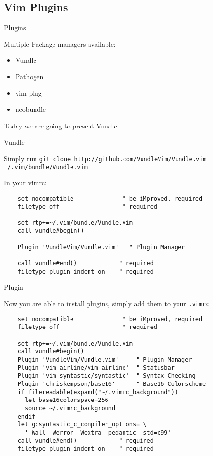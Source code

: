 \documentclass{beamer}
\begin{document}
\subsection*{Vim Plugins}

\begin{frame}{Plugins}

  Multiple Package managers available:
  \begin{itemize}
    \item Vundle
    \item Pathogen
    \item vim-plug
    \item neobundle
  \end{itemize}

  Today we are going to present Vundle

\end{frame}

\begin{frame}[fragile]{Vundle}

  Simply run \texttt{git clone http://github.com/VundleVim/Vundle.vim ~/.vim/bundle/Vundle.vim}

  In your vimrc:
  \begin{verbatim}
    set nocompatible              " be iMproved, required
    filetype off                  " required

    set rtp+=~/.vim/bundle/Vundle.vim
    call vundle#begin()

    Plugin 'VundleVim/Vundle.vim'   " Plugin Manager

    call vundle#end()            " required
    filetype plugin indent on    " required
  \end{verbatim}

\end{frame}

\begin{frame}[fragile]{Plugin}

  Now you are able to install plugins, simply add them to your \texttt{.vimrc}
  \begin{verbatim}
    set nocompatible              " be iMproved, required
    filetype off                  " required

    set rtp+=~/.vim/bundle/Vundle.vim
    call vundle#begin()
    Plugin 'VundleVim/Vundle.vim'     " Plugin Manager
    Plugin 'vim-airline/vim-airline'  " Statusbar
    Plugin 'vim-syntastic/syntastic'  " Syntax Checking
    Plugin 'chriskempson/base16'      " Base16 Colorscheme
    if filereadable(expand("~/.vimrc_background"))
      let base16colorspace=256
      source ~/.vimrc_background
    endif
    let g:syntastic_c_compiler_options= \
      '-Wall -Werror -Wextra -pedantic -std=c99'
    call vundle#end()            " required
    filetype plugin indent on    " required
  \end{verbatim}


\end{frame}
\end{document}
